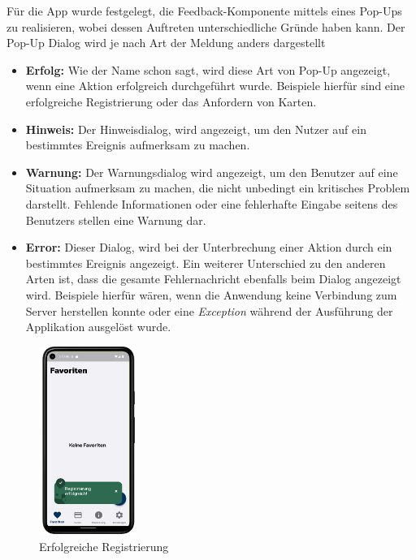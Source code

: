 Für die App wurde festgelegt, die Feedback-Komponente mittels eines Pop-Ups zu realisieren, wobei dessen Auftreten unterschiedliche Gründe haben kann. Der Pop-Up Dialog wird je nach Art der Meldung anders dargestellt
\begin{itemize}
        \item {\textbf{Erfolg:}} Wie der Name schon sagt, wird diese Art von Pop-Up angezeigt, wenn eine Aktion erfolgreich durchgeführt wurde. Beispiele hierfür sind eine erfolgreiche Registrierung oder das Anfordern von Karten.
        \item {\textbf{Hinweis:}} Der Hinweisdialog, wird angezeigt, um den Nutzer auf ein bestimmtes Ereignis aufmerksam zu machen. 

        \item {\textbf{Warnung:}} Der Warnungsdialog wird angezeigt, um den Benutzer auf eine Situation aufmerksam zu machen, die nicht unbedingt ein kritisches Problem darstellt. Fehlende Informationen oder eine fehlerhafte Eingabe seitens des Benutzers stellen eine Warnung dar.


        \item {\textbf{Error:}} Dieser Dialog, wird bei der Unterbrechung einer Aktion durch ein bestimmtes Ereignis angezeigt. Ein weiterer Unterschied zu den anderen Arten ist, dass die gesamte Fehlernachricht ebenfalls beim Dialog angezeigt wird. Beispiele hierfür wären, wenn die Anwendung keine Verbindung zum Server herstellen konnte oder eine {\textit{Exception}} während der Ausführung der Applikation ausgelöst wurde.
\end{itemize}

\begin{figure}[h!]
\centering
\includegraphics[width=0.28\textwidth]{FLUTTER/images/GP/Login_register_sucees.png}
\caption{Erfolgreiche  Registrierung}
\end{figure}


